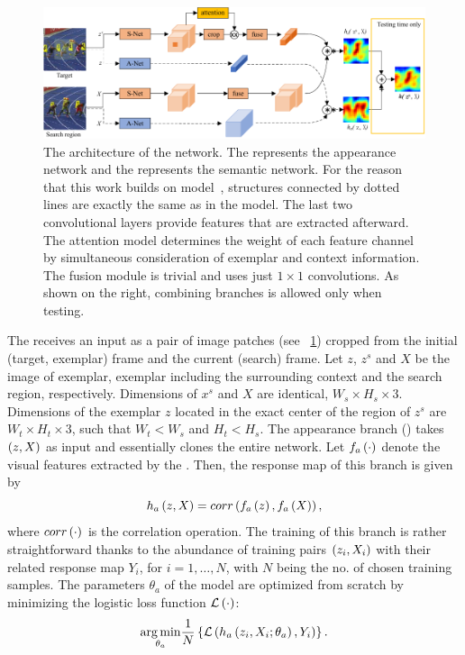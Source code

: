 \begin{figure}[t]
    \centerline{\includegraphics[width=\linewidth]{figures/theoretical_foundations/twofold_siamese_net_architecture.pdf}}
    \caption[\sasiam{} architecture]{The architecture of the \sasiam{} network. The \anet{} represents the appearance network and the \snet{} represents the semantic network. For the reason that this work builds on \siamfc{} model~\cite{bertinetto2016siamfc}, structures connected by dotted lines are exactly the same as in the \siamfc{} model. The last two convolutional layers provide features that are extracted afterward. The attention model determines the weight of each feature channel by simultaneous consideration of exemplar and context information. The fusion module is trivial and uses just $1 \times 1$ convolutions. As shown on the right, combining branches is allowed only when testing. }
    \label{fig:TwofoldSiameseNetArchitecture}
\end{figure}

The \sasiam{} receives an input as a pair of image patches (see \figstr{}~\ref{fig:TwofoldSiameseNetArchitecture}) cropped from the initial (target, exemplar) frame and the current (search) frame. Let $z$, $z^s$ and $X$ be the image of exemplar, exemplar including the surrounding context and the search region, respectively. Dimensions of $x^s$ and $X$ are identical, $W_s \times H_s \times 3$. Dimensions of the exemplar $z$ located in the exact center of the region of $z^s$ are $W_t \times H_t \times 3$, such that $W_t < W_s$ and $H_t < H_s$. The appearance branch (\anet{}) takes $\left( {z, X} \right)$ as input and essentially clones the entire \siamfc{} network. Let ${f_a} \left( \cdot \right)$ denote the visual features extracted by the \anet{}. Then, the response map of this branch is given by
\begin{equation}
    {h_a} \left( z, X \right) = {corr} \left( {f_a} \left( z \right), {f_a} \left( X \right) \right),
\end{equation}
where ${corr} \left( \cdot \right)$ is the correlation operation. The training of this branch is rather straightforward thanks to the abundance of training pairs $\left( {z_i, X_i} \right)$ with their related response map $Y_i$, for $i = 1, \dots, N$, with $N$ being the no. of chosen training samples. The parameters $\theta_a$ of the \anet{} model are optimized from scratch by minimizing the logistic loss function ${\mathcal{L}} \left( \cdot \right)$:
\begin{equation}
    \label{eq:ANetModelTraining}
    \underset{\theta_a}{\operatorname*{arg\,min}}
    \frac{1}{N}
    \left\{ {
        {\mathcal{L}} \left( 
            {h_a} \left( z_i, X_i; \theta_a \right),
            Y_i
         \right)
    } \right\}.
\end{equation}


